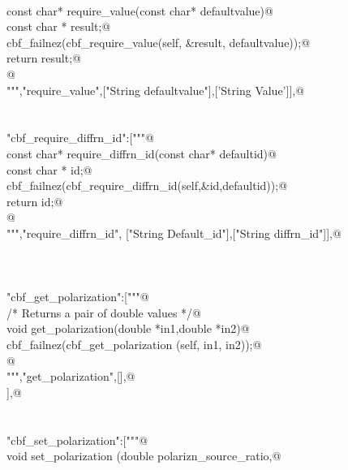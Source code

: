 \documentclass[10pt,a4paper,twoside,notitlepage]{article}
\begin{document}
\begin{flushleft}
\begin{list}{}{}
\mbox{}\verb@@\\
\mbox{}\verb@   const char* require_value(const char* defaultvalue){@\\
\mbox{}\verb@     const char * result;@\\
\mbox{}\verb@     cbf_failnez(cbf_require_value(self, &result, defaultvalue));@\\
\mbox{}\verb@     return result;@\\
\mbox{}\verb@    }@\\
\mbox{}\verb@""","require_value",["String defaultvalue"],['String Value']],@\\
\mbox{}\verb@@\\
\mbox{}\verb@@\\
\mbox{}\verb@"cbf_require_diffrn_id":["""@\\
\mbox{}\verb@   const char* require_diffrn_id(const char* defaultid){@\\
\mbox{}\verb@     const char * id;@\\
\mbox{}\verb@     cbf_failnez(cbf_require_diffrn_id(self,&id,defaultid));@\\
\mbox{}\verb@     return id;@\\
\mbox{}\verb@     }@\\
\mbox{}\verb@""","require_diffrn_id", ["String Default_id"],["String diffrn_id"]],@\\
\mbox{}\verb@@\\
\mbox{}\verb@@\\
\mbox{}\verb@@\\
\mbox{}\verb@"cbf_get_polarization":["""@\\
\mbox{}\verb@     /* Returns a pair of double values */@\\
\mbox{}\verb@%apply double *OUTPUT { double *in1, double *in2 };@\\
\mbox{}\verb@     void get_polarization(double *in1,double *in2){@\\
\mbox{}\verb@        cbf_failnez(cbf_get_polarization (self, in1, in2));@\\
\mbox{}\verb@     }@\\
\mbox{}\verb@""","get_polarization",[],@\\
\mbox{}],@\\
\mbox{}\verb@@\\
\mbox{}\verb@@\\
\mbox{}\verb@"cbf_set_polarization":["""@\\
\mbox{}\verb@     void set_polarization (double polarizn_source_ratio,@\\

\end{list}
\end{flushleft}
\end{document}
